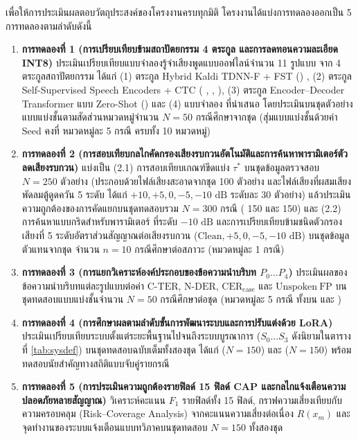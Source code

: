 เพื่อให้การประเมินผลตอบวัตถุประสงค์ของโครงงานครบทุกมิติ โครงงานได้แบ่งการทดลองออกเป็น 5 การทดลองตามลำดับดังนี้
\begin{enumerate}[label=(\arabic*), leftmargin=*, align=left]
    \item \textbf{การทดลองที่ 1 (การเปรียบเทียบข้ามสถาปัตยกรรม 4 ตระกูล และการลดทอนความละเอียด INT8)} ประเมินเปรียบเทียบแบบจำลองรู้จำเสียงพูดแบบออฟไลน์จำนวน 11 รูปแบบ จาก 4 ตระกูลสถาปัตยกรรม ได้แก่ (1) ตระกูล Hybrid Kaldi TDNN-F + FST () \cite{povey2011kaldi,vosk}, (2) ตระกูล Self-Supervised Speech Encoders + CTC ( \cite{chen2022wavlm},  \cite{baevski2020wav2vec},  \cite{hsu2021hubert}), (3) ตระกูล Encoder--Decoder Transformer แบบ Zero-Shot () \cite{radford2023whisper,fasterwhisper} และ (4) แบบจำลอง  ที่นำเสนอ โดยประเมินบนชุดตัวอย่างแบบแบ่งชั้นตามสัดส่วนหมวดหมู่จำนวน $N = 50$ กรณีศึกษาจากชุด  (สุ่มแบบแบ่งชั้นด้วยค่า Seed คงที่ หมวดหมู่ละ 5 กรณี ครบทั้ง 10 หมวดหมู่)
    \item \textbf{การทดลองที่ 2 (การสอบเทียบกลไกคัดกรองเสียงรบกวนอัตโนมัติและการค้นหาพารามิเตอร์ตัวลดเสียงรบกวน)} แบ่งเป็น (2.1) การสอบเทียบเกณฑ์ขีดแบ่ง $\tau^*$ บนชุดข้อมูลตรวจสอบ $N = 250$ ตัวอย่าง (ประกอบด้วยไฟล์เสียงสะอาดจากชุด  100 ตัวอย่าง และไฟล์เสียงที่ผสมเสียงพัดลมตู้ดูดควัน 5 ระดับ ได้แก่ $+10, +5, 0, -5, -10\text{ dB}$ ระดับละ 30 ตัวอย่าง) แล้วประเมินความถูกต้องของการคัดแยกบนชุดทดสอบรวม $N = 300$ กรณี ( 150 และ  150) และ (2.2) การค้นหาแบบกริดสำหรับพารามิเตอร์  ที่ระดับ $-10\text{ dB}$ และการเปรียบเทียบข้ามชนิดตัวกรองเสียงที่ 5 ระดับอัตราส่วนสัญญาณต่อเสียงรบกวน ($\mathrm{Clean}, +5, 0, -5, -10\text{ dB}$) บนชุดข้อมูลตัวแทนจากชุด  จำนวน $n = 10$ กรณีศึกษาต่อสภาวะ (หมวดหมู่ละ 1 กรณี)
    \item \textbf{การทดลองที่ 3 (การแยกวิเคราะห์องค์ประกอบของข้อความนำบริบท $P_0 \dots P_4$)} ประเมินผลของข้อความนำบริบทแต่ละรูปแบบต่อค่า $\mathrm{C\text{-}TER}$, $\mathrm{N\text{-}DER}$, $\mathrm{CER}_{\mathrm{case}}$ และ $\mathrm{Unspoken\ FP}$ บนชุดทดสอบแบบแบ่งชั้นจำนวน $N = 50$ กรณีศึกษาต่อชุด (หมวดหมู่ละ 5 กรณี ทั้งบน  และ )
    \item \textbf{การทดลองที่ 4 (การศึกษาผลตามลำดับขั้นการพัฒนาระบบและการปรับแต่งด้วย LoRA)} ประเมินเปรียบเทียบระบบตั้งแต่ระยะพื้นฐานไปจนถึงระบบบูรณาการ ($S_0 \dots S_3$ ดังนิยามในตารางที่ \ref{tab:sysdef}) บนชุดทดสอบฉบับเต็มทั้งสองชุด ได้แก่  ($N = 150$) และ  ($N = 150$) พร้อมทดสอบนัยสำคัญทางสถิติแบบจับคู่รายกรณี
    \item \textbf{การทดลองที่ 5 (การประเมินความถูกต้องรายฟิลด์ 15 ฟิลด์ CAP และกลไกแจ้งเตือนความปลอดภัยหลายสัญญาณ)} วิเคราะห์คะแนน $F_1$ รายฟิลด์ทั้ง 15 ฟิลด์, กราฟความเสี่ยงเทียบกับความครอบคลุม (Risk--Coverage Analysis) จากคะแนนความเสี่ยงต่อเนื่อง $R(x_m)$ และจุดทำงานของระบบแจ้งเตือนแบบทวิภาคบนชุดทดสอบ $N = 150$ ทั้งสองชุด
\end{enumerate}

